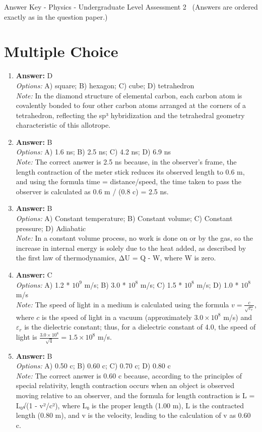 \documentclass[12pt]{article}
\begin{document}
\begin{center}
Answer Key - Physics - Undergraduate Level Assessment 2 \
\small (Answers are ordered exactly as in the question paper.)
\end{center}

\section*{Multiple Choice}
\begin{enumerate}[label=\arabic*.]
\item \textbf{Answer:} D
\\ \textit{Options:} A) square; B) hexagon; C) cube; D) tetrahedron
\\ \textit{Note:} In the diamond structure of elemental carbon, each carbon atom is covalently bonded to four other carbon atoms arranged at the corners of a tetrahedron, reflecting the sp³ hybridization and the tetrahedral geometry characteristic of this allotrope.
\item \textbf{Answer:} B
\\ \textit{Options:} A) 1.6 ns; B) 2.5 ns; C) 4.2 ns; D) 6.9 ns
\\ \textit{Note:} The correct answer is 2.5 ns because, in the observer's frame, the length contraction of the meter stick reduces its observed length to 0.6 m, and using the formula time = distance/speed, the time taken to pass the observer is calculated as 0.6 m / (0.8 c) = 2.5 ns.
\item \textbf{Answer:} B
\\ \textit{Options:} A) Constant temperature; B) Constant volume; C) Constant pressure; D) Adiabatic
\\ \textit{Note:} In a constant volume process, no work is done on or by the gas, so the increase in internal energy is solely due to the heat added, as described by the first law of thermodynamics, ΔU = Q - W, where W is zero.
\item \textbf{Answer:} C
\\ \textit{Options:} A) 1.2 * $10^9$ m/s; B) 3.0 * $10^8$ m/s; C) 1.5 * $10^8$ m/s; D) 1.0 * $10^8$ m/s
\\ \textit{Note:} The speed of light in a medium is calculated using the formula \( v = \frac{c}{\sqrt{\varepsilon_r}} \), where \( c \) is the speed of light in a vacuum (approximately \( 3.0 \times 10^8 \) m/s) and \( \varepsilon_r \) is the dielectric constant; thus, for a dielectric constant of 4.0, the speed of light is \( \frac{3.0 \times 10^8}{\sqrt{4}} = 1.5 \times 10^8 \) m/s.
\item \textbf{Answer:} B
\\ \textit{Options:} A) 0.50 c; B) 0.60 c; C) 0.70 c; D) 0.80 c
\\ \textit{Note:} The correct answer is 0.60 c because, according to the principles of special relativity, length contraction occurs when an object is observed moving relative to an observer, and the formula for length contraction is L = L₀√(1 - v²/c²), where L₀ is the proper length (1.00 m), L is the contracted length (0.80 m), and v is the velocity, leading to the calculation of v as 0.60 c.
\end{enumerate}
\end{document}
